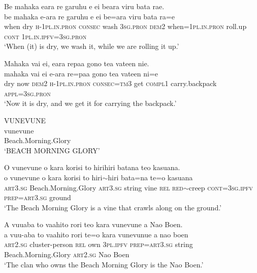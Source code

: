 \ea\label{ex:text7-94}
Be mahaka eara re garuhu e ei beara viru bata rae.\\
\gll be	mahaka	e-ara	re	garuhu	e	ei	be=ara	viru	bata	ra=e\\
     when	dry	\textsc{h}-1\textsc{pl}.\textsc{in}.\textsc{pron}	\textsc{consec}	wash	3\textsc{sg}.\textsc{pron}	\textsc{dem}2	when=1\textsc{pl}.\textsc{in}.\textsc{pron}	roll.up	\textsc{cont}	1\textsc{pl}.\textsc{in}.\textsc{ipfv}=3\textsc{sg}.\textsc{pron}\\
\glt `When (it) is dry, we wash it, while we are rolling it up.'
\z

\ea\label{ex:text7-95}
Mahaka vai ei, eara repaa gono tea vateen nie.\\
\gll mahaka	vai	ei	e-ara	re=paa	gono	tea	vateen	ni=e\\
     dry	now	\textsc{dem}2	\textsc{h}-1\textsc{pl}.\textsc{in}.\textsc{pron}	\textsc{consec}=\textsc{tm}3	get	\textsc{compl}1	carry.backpack	\textsc{appl}=3\textsc{sg}.\textsc{pron}\\
\glt `Now it is dry, and we get it for carrying the backpack.'
\z

\ea\label{ex:text7-96}
VUNEVUNE\\
\gll vunevune\\
     Beach.Morning.Glory\\
\glt `BEACH MORNING GLORY'
\z

\ea\label{ex:text7-97}
O vunevune o kara korisi to hirihiri batana teo kasuana.\\
\gll o	vunevune	o	kara	korisi	to	hiri{$\sim$}hiri	bata=na	te=o	kasuana\\
     \textsc{art}3.\textsc{sg}	Beach.Morning.Glory	\textsc{art}3.\textsc{sg}	string	vine	\textsc{rel}	\textsc{red}{$\sim$}creep	\textsc{cont}=3\textsc{sg}.\textsc{ipfv}	\textsc{prep}=\textsc{art}3.\textsc{sg}	ground\\
\glt `The Beach Morning Glory is a vine that crawls along on the ground.'
\z

\ea\label{ex:text7-98}
A vuuaba to vaahito rori teo kara vunevune a Nao Boen.\\
\gll a	vuu-aba	to	vaahito	rori	te=o	kara	vunevunue	a	nao	boen\\
     \textsc{art}2.\textsc{sg}	cluster-person	\textsc{rel}	own	3\textsc{pl}.\textsc{ipfv}	\textsc{prep}=\textsc{art}3.\textsc{sg}	string	Beach.Morning.Glory	\textsc{art}2.\textsc{sg}	Nao	Boen\\
\glt `The clan who owns the Beach Morning Glory is the Nao Boen.'
\z
